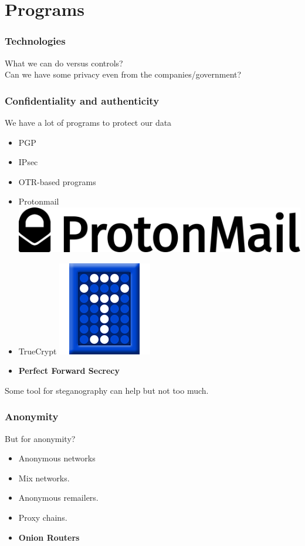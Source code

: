 \section{Programs}
\begin{frame}
	\frametitle{Technologies}
	What we can do versus controls?\\
	Can we have some privacy even from the companies/government?
\end{frame}

\begin{frame}
	\frametitle{Confidentiality and authenticity}
	We have a lot of programs to protect our data
	\begin{itemize}
		\item PGP
		\item IPsec
		\item OTR-based programs
		\item Protonmail \includegraphics[scale=0.017]{imgs/Protonmail_logo}
		\item TrueCrypt \includegraphics[scale=0.1]{imgs/TrueCrypt_Logo}
		\item \textbf{Perfect Forward Secrecy}
	\end{itemize}
	Some tool for steganography can help but not too much.
\end{frame}

\begin{frame}
	\frametitle{Anonymity}
	But for anonymity?
	\begin{itemize}
		\item Anonymous networks
		\item Mix networks.
		\item Anonymous remailers.
		\item Proxy chains.
		\item \textbf{Onion Routers}
	\end{itemize}
\end{frame}

